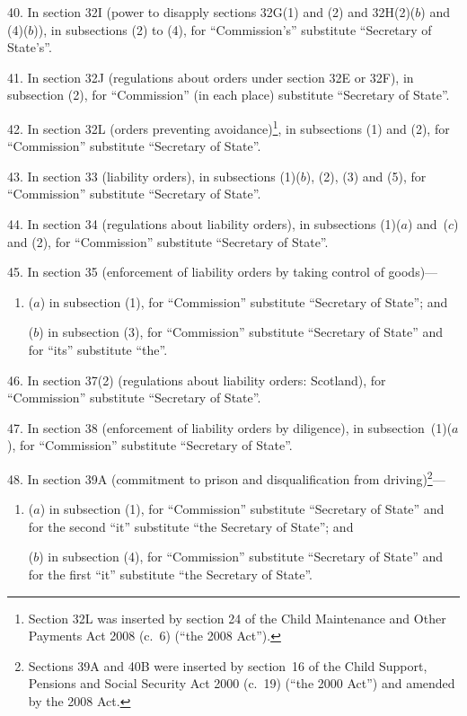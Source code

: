 \documentclass[12pt,a4paper]{article}
\begin{document}
\medskip

40.  In section 32I (power to disapply sections 32G(1) and (2) and 32H(2)($b$)  and (4)($b$)), in subsections (2) to (4), for “Commission’s” substitute “Secretary of State’s”.

\medskip

41.  In section 32J (regulations about orders under section 32E or 32F), in subsection (2), for “Commission” (in each place) substitute “Secretary of State”.

\medskip

42.  In section 32L (orders preventing avoidance)\footnote{Section 32L was inserted by section 24 of the Child Maintenance and Other Payments Act 2008 (c.~6) (“the 2008 Act”).}, in subsections (1) and (2), for “Commission” substitute “Secretary of State”.

\medskip

43.  In section 33 (liability orders), in subsections (1)($b$), (2), (3) and (5), for “Commission” substitute “Secretary of State”.

\medskip

44.  In section 34 (regulations about liability orders), in subsections (1)($a$)  and~($c$)  and (2), for “Commission” substitute “Secretary of State”.

\medskip

45.  In section 35 (enforcement of liability orders by taking control of goods)—
\begin{enumerate}\item[]
($a$) in subsection (1), for “Commission” substitute “Secretary of State”; and

($b$) in subsection (3), for “Commission” substitute “Secretary of State” and for “its” substitute “the”.
\end{enumerate}

\medskip

46.  In section 37(2) (regulations about liability orders: Scotland), for “Commission” substitute “Secretary of State”.

\medskip

47.  In section 38 (enforcement of liability orders by diligence), in subsection~(1)($a$), for “Commission” substitute “Secretary of State”.

\medskip

48.  In section 39A (commitment to prison and disqualification from driving)\footnote{Sections 39A and 40B were inserted by section~16 of the Child Support, Pensions and Social Security Act 2000 (c.~19) (“the 2000 Act”) and amended by the 2008 Act.}—
\begin{enumerate}\item[]
($a$) in subsection (1), for “Commission” substitute “Secretary of State” and for the second “it” substitute “the Secretary of State”; and

($b$) in subsection (4), for “Commission” substitute “Secretary of State” and for the first “it” substitute “the Secretary of State”.
\end{enumerate}
\end{document}

